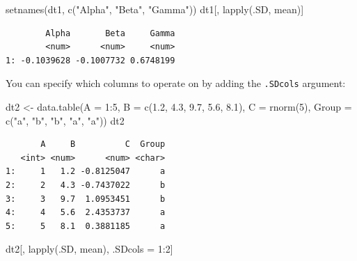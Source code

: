 \documentclass[
]{book}
\newenvironment{Shaded}{\begin{snugshade}}{\end{snugshade}}
\newcommand{\AttributeTok}[1]{\textcolor[rgb]{0.77,0.63,0.00}{#1}}
\newcommand{\DecValTok}[1]{\textcolor[rgb]{0.00,0.00,0.81}{#1}}
\newcommand{\FloatTok}[1]{\textcolor[rgb]{0.00,0.00,0.81}{#1}}
\newcommand{\FunctionTok}[1]{\textcolor[rgb]{0.00,0.00,0.00}{#1}}
\newcommand{\NormalTok}[1]{#1}
\newcommand{\OtherTok}[1]{\textcolor[rgb]{0.56,0.35,0.01}{#1}}
\newcommand{\SpecialCharTok}[1]{\textcolor[rgb]{0.00,0.00,0.00}{#1}}
\newcommand{\StringTok}[1]{\textcolor[rgb]{0.31,0.60,0.02}{#1}}
\begin{document}
\begin{Shaded}
\begin{Highlighting}[]
\FunctionTok{setnames}\NormalTok{(dt1, }\FunctionTok{c}\NormalTok{(}\StringTok{"Alpha"}\NormalTok{, }\StringTok{"Beta"}\NormalTok{, }\StringTok{"Gamma"}\NormalTok{))}
\NormalTok{dt1[, }\FunctionTok{lapply}\NormalTok{(.SD, mean)]}
\end{Highlighting}
\end{Shaded}

\begin{verbatim}
        Alpha       Beta     Gamma
        <num>      <num>     <num>
1: -0.1039628 -0.1007732 0.6748199
\end{verbatim}

You can specify which columns to operate on by adding the \texttt{.SDcols} argument:

\begin{Shaded}
\begin{Highlighting}[]
\NormalTok{dt2 }\OtherTok{\textless{}{-}} \FunctionTok{data.table}\NormalTok{(}\AttributeTok{A =} \DecValTok{1}\SpecialCharTok{:}\DecValTok{5}\NormalTok{,}
                  \AttributeTok{B =} \FunctionTok{c}\NormalTok{(}\FloatTok{1.2}\NormalTok{, }\FloatTok{4.3}\NormalTok{, }\FloatTok{9.7}\NormalTok{, }\FloatTok{5.6}\NormalTok{, }\FloatTok{8.1}\NormalTok{),}
                  \AttributeTok{C =} \FunctionTok{rnorm}\NormalTok{(}\DecValTok{5}\NormalTok{),}
                  \AttributeTok{Group =} \FunctionTok{c}\NormalTok{(}\StringTok{"a"}\NormalTok{, }\StringTok{"b"}\NormalTok{, }\StringTok{"b"}\NormalTok{, }\StringTok{"a"}\NormalTok{, }\StringTok{"a"}\NormalTok{))}
\NormalTok{dt2}
\end{Highlighting}
\end{Shaded}

\begin{verbatim}
       A     B          C  Group
   <int> <num>      <num> <char>
1:     1   1.2 -0.8125047      a
2:     2   4.3 -0.7437022      b
3:     3   9.7  1.0953451      b
4:     4   5.6  2.4353737      a
5:     5   8.1  0.3881185      a
\end{verbatim}

\begin{Shaded}
\begin{Highlighting}[]
\NormalTok{dt2[, }\FunctionTok{lapply}\NormalTok{(.SD, mean), .SDcols }\OtherTok{=} \DecValTok{1}\SpecialCharTok{:}\DecValTok{2}\NormalTok{]}
\end{Highlighting}
\end{Shaded}
\end{document}

